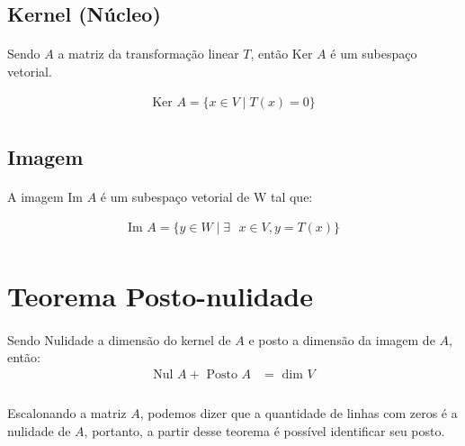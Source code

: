 \documentclass{article}
\begin{document}
        \subsection{Kernel (Núcleo)}
            \paragraph{}
            Sendo $A$ a matriz da transformação linear $T$, então $\text{Ker } A$ é um subespaço vetorial.

            \begin{align*}
                \text{Ker } A = \{x \in V \mid T(x) = 0\}\\
            \end{align*}

        \subsection{Imagem}
            \paragraph{}
            A  imagem Im $A$ é um subespaço vetorial de W tal que: 

            \begin{align*}
                \text{Im } A = \{ y \in W \mid \exists\text{ } x \in V, y = T(x) \}\\
            \end{align*}

    \section{Teorema Posto-nulidade}
        \paragraph{}
        Sendo Nulidade a dimensão do kernel de $A$ e posto a dimensão da imagem de $A$, então:
        \begin{align*}
            \text{Nul } A + \text{ Posto } A &= \text{ dim } V\\
        \end{align*}

        \paragraph{}
        Escalonando a matriz $A$, podemos dizer que a quantidade de linhas com zeros é a nulidade de $A$, portanto, a partir desse
        teorema é possível identificar seu posto.
\end{document}
